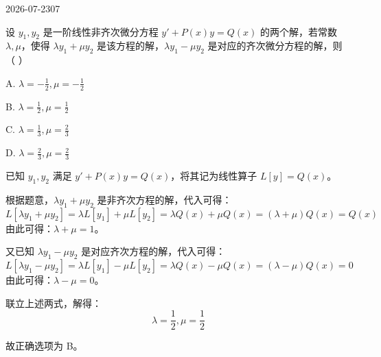 \begin{mistake}{2026-07-23}{07}

\begin{problemcontent}
设 \(y_1, y_2\) 是一阶线性非齐次微分方程 \(y' + P(x)y = Q(x)\) 的两个解，若常数 \(\lambda, \mu\)，使得 \(\lambda y_1 + \mu y_2\) 是该方程的解，\(\lambda y_1 - \mu y_2\) 是对应的齐次微分方程的解，则（ ）

A. \(\lambda = -\frac{1}{2}, \mu = -\frac{1}{2}\)

B. \(\lambda = \frac{1}{2}, \mu = \frac{1}{2}\)

C. \(\lambda = \frac{1}{3}, \mu = \frac{2}{3}\)

D. \(\lambda = \frac{2}{3}, \mu = \frac{2}{3}\)
\end{problemcontent}

\begin{solutioncontent}
已知 \(y_1, y_2\) 满足 \(y' + P(x)y = Q(x)\)，将其记为线性算子 \(L[y] = Q(x)\)。

根据题意，\(\lambda y_1 + \mu y_2\) 是非齐次方程的解，代入可得：
\[ L[\lambda y_1 + \mu y_2] = \lambda L[y_1] + \mu L[y_2] = \lambda Q(x) + \mu Q(x) = (\lambda + \mu)Q(x) = Q(x) \]
由此可得：\(\lambda + \mu = 1\)。

又已知 \(\lambda y_1 - \mu y_2\) 是对应齐次方程的解，代入可得：
\[ L[\lambda y_1 - \mu y_2] = \lambda L[y_1] - \mu L[y_2] = \lambda Q(x) - \mu Q(x) = (\lambda - \mu)Q(x) = 0 \]
由此可得：\(\lambda - \mu = 0\)。

联立上述两式，解得：
\[ \lambda = \frac{1}{2}, \mu = \frac{1}{2} \]

故正确选项为 B。
\end{solutioncontent}


\end{mistake}
